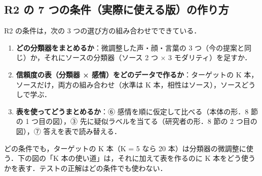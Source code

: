 \documentclass[a4paper,11pt]{ltjsarticle}
\begin{document}
\subsection*{R2 の 7 つの条件（実際に使える版）の作り方}

R2 の条件は，次の 3 つの選び方の組み合わせでできている．
\begin{enumerate}
  \item \textbf{どの分類器をまとめるか}：微調整した声・顔・言葉の 3 つ（今の提案と同じ）か，それにソースの分類器（ソース 2 つ × 3 モダリティ）を足すか．
  \item \textbf{信頼度の表（分類器 × 感情）をどのデータで作るか}：ターゲットの K 本，ソースだけ，両方の組み合わせ（水準は K 本，相性はソース），ソースどうしで学ぶ．
  \item \textbf{表を使ってどうまとめるか}：⑥ 感情を順に仮定して比べる（本体の形．8 節の 1 つ目の図），③ 先に疑似ラベルを当てる（研究者の形．8 節の 2 つ目の図），⑦ 答えを表で読み替える．
\end{enumerate}
どの条件でも，ターゲットの K 本（K = 5 なら 20 本）は分類器の微調整に使う．下の図の「K 本の使い道」は，それに加えて表を作るのに K 本をどう使うかを表す．テストの正解はどの条件でも使わない．
\end{document}
